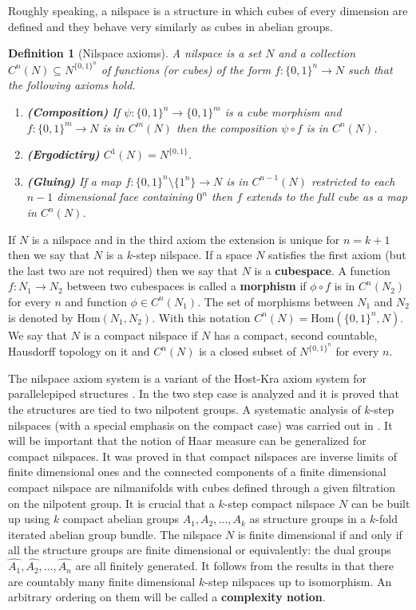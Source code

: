 \documentclass [11pt] {article}
\newcommand{\Hom}{\mathrm{Hom}}
\newtheorem{definition}{Definition}[section]
\begin{document}
Roughly speaking, a nilspace is a structure in which cubes of every dimension are defined and they behave very similarly as cubes in abelian groups.
\begin{definition}[Nilspace axioms] A nilspace is a set $N$ and a collection $C^n(N)\subseteq N^{\{0,1\}^n}$ of functions (or cubes) of the form $f:\{0,1\}^n\rightarrow N$ such that the following axioms hold.
\begin{enumerate}
\item {\bf(Composition)} If $\psi:\{0,1\}^n\rightarrow\{0,1\}^m$ is a cube morphism and $f:\{0,1\}^m\rightarrow N$ is in $C^m(N)$ then the composition $\psi\circ f$ is in $C^n(N)$.
\item {\bf(Ergodictiry)} $C^1(N)=N^{\{0,1\}}$.
\item {\bf(Gluing)} If a map $f:\{0,1\}^n\setminus\{1^n\}\rightarrow N$ is in $C^{n-1}(N)$ restricted to each $n-1$ dimensional face containing $0^n$ then $f$ extends to the full cube as a map in $C^n(N)$.
\end{enumerate} 
\end{definition}

\bigskip

If $N$ is a nilspace and in the third axiom the extension is unique for $n=k+1$ then we say that $N$ is a $k$-step nilspace.
If a space $N$ satisfies the first axiom (but the last two are not required) then we say that $N$ is a {\bf cubespace}. 
A function $f:N_1\rightarrow N_2$ between two cubespaces is called a {\bf morphism} if $\phi\circ f$ is in $C^n(N_2)$ for every $n$ and function $\phi\in C^n(N_1)$.
The set of morphisms between $N_1$ and $N_2$ is denoted by $\Hom(N_1,N_2)$. With this notation $C^n(N)=\Hom(\{0,1\}^n,N)$.
We say that $N$ is a compact nilspace if $N$ has a compact, second countable, Hausdorff topology on it and $C^n(N)$ is a closed subset of $N^{\{0,1\}^n}$ for every $n$. 

The nilspace axiom system is a variant of the Host-Kra axiom system for parallelepiped structures \cite{HKr2}. In \cite{HKr2} the two step case is analyzed and it is proved that the structures are tied to two nilpotent groups. A systematic analysis of $k$-step nilspaces (with a special emphasis on the compact case) was carried out in \cite{NP}. It will be important that the notion of Haar measure can be generalized for compact nilspaces. It was proved in \cite{NP} that compact nilspaces are inverse limits of finite dimensional ones and the connected components of a finite dimensional compact nilspace are nilmanifolds with cubes defined through a given filtration on the nilpotent group. It is crucial that a $k$-step compact nilspace $N$ can be built up using $k$ compact abelian groups $A_1,A_2,\dots,A_k$ as structure groups in a $k$-fold iterated abelian group bundle. The nilspace $N$ is finite dimensional if and only if all the structure groups are finite dimensional or equivalently: the dual groups $\hat{A_1},\hat{A_2},\dots,\hat{A_n}$ are all finitely generated. 
It follows from the results in \cite{NP} that there are countably many finite dimensional $k$-step nilspaces up to isomorphism. An arbitrary ordering on them will be called a {\bf complexity notion}.
\end{document}
